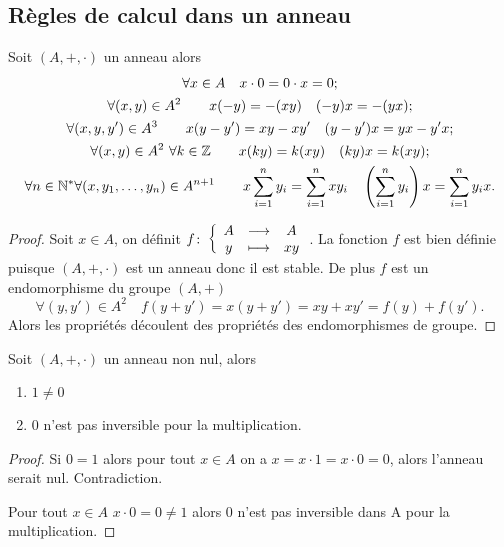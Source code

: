 \subsection{Règles de calcul dans un anneau}

\begin{theo}
  Soit $(A,+,\cdot)$ un anneau alors
  \begin{gather}
    \forall x \in A \quad x \cdot 0 = 0 \cdot x = 0; \\
    \forall (x,y) \in A^2 \qquad x(-y)=-(xy) \quad (-y)x=-(yx); \\
    \forall (x,y,y') \in A^3 \qquad x(y-y')=xy-xy' \quad (y-y')x=yx-y'x; \\
    \forall (x,y) \in A^2 \ \forall k \in \mathbb{Z} \qquad x(ky)=k(xy) \quad (ky)x=k(xy); \\
    \forall n \in \mathbb{N}^* \forall (x, y_1, \ldots, y_n) \in A^{n+1} \qquad x \sum_{i=1}^n y_i = \sum_{i=1}^n xy_i \quad \left(\sum_{i=1}^n y_i\right)x = \sum_{i=1}^n y_ix.
  \end{gather}
\end{theo}
\begin{proof}
  Soit $x \in A$, on définit $f\colon \left\{\begin{array}{ccc} A & \longrightarrow &A\\ y & \longmapsto & xy \end{array} \right.$. La fonction $f$ est bien définie puisque $(A,+,\cdot)$ est un anneau donc il est stable. De plus $f$ est un endomorphisme du groupe $(A,+)$
  \begin{equation}
    \forall (y,y') \in A^2 \quad f(y+y')=x(y+y')=xy+xy'=f(y)+f(y').
  \end{equation}
  Alors les propriétés découlent des propriétés des endomorphismes de groupe.
\end{proof}
\begin{theo}
  Soit $(A,+,\cdot)$ un anneau non nul, alors
  \begin{enumerate}
  \item $1 \neq 0$
  \item $0$ n'est pas inversible pour la multiplication.
  \end{enumerate}
\end{theo}
\begin{proof}
  Si $0=1$ alors pour tout $x \in A$ on a $x=x\cdot 1=x\cdot 0=0$, alors l'anneau serait nul. Contradiction.

Pour tout $x \in A$ $x \cdot 0=0 \neq 1$ alors $0$ n'est pas inversible dans A pour la multiplication.
\end{proof}

